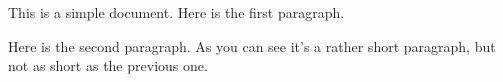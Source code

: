 \documentclass[12pt]{scrartcl}
\begin{document}
This is a simple document.
Here is the first paragraph.

Here is the second paragraph. As you
can       see it's 
a rather 
short paragraph, but not as short as the previous one.
\end{document}
